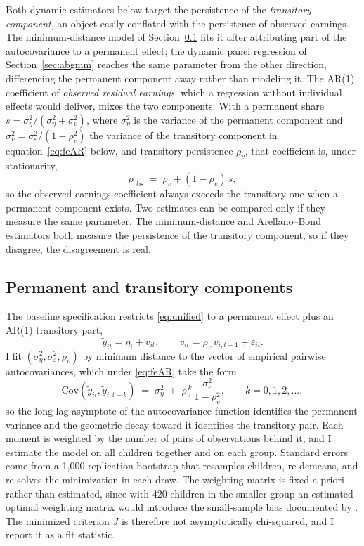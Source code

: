 \documentclass[11pt]{article}
\begin{document}
Both dynamic estimators below target the persistence of the
\emph{transitory component}, an object easily conflated with the
persistence of observed earnings. The minimum-distance model of
Section~\ref{sec:md} fits it after attributing part of the
autocovariance to a permanent effect; the dynamic panel regression of
Section~\ref{sec:abgmm} reaches the same parameter from the other
direction, differencing the permanent component away rather than
modeling it. The AR(1) coefficient of \emph{observed residual
earnings}, which a regression without individual effects would deliver,
mixes the two components. With a permanent share
$s = \sigma^2_\eta / (\sigma^2_\eta + \sigma^2_v)$, where
$\sigma^2_\eta$ is the variance of the permanent component and
$\sigma^2_v = \sigma^2_\varepsilon/(1-\rho_v^2)$ the variance of the
transitory component in equation~\eqref{eq:feAR} below, and transitory
persistence $\rho_v$,
that coefficient is, under stationarity,
\begin{equation}
\rho_{\mathrm{obs}} \;=\; \rho_v + (1 - \rho_v)\, s,
\label{eq:rhoobs}
\end{equation}
so the observed-earnings coefficient always exceeds the transitory one
when a permanent component exists. Two estimates can be compared
only if they measure the same parameter. The minimum-distance and
Arellano--Bond estimators both measure the persistence of the
transitory component, so if they disagree, the disagreement is real.

\subsection{Permanent and transitory components}
\label{sec:md}

The baseline specification restricts \eqref{eq:unified} to a permanent
effect plus an AR(1) transitory part,
\begin{equation}
\tilde y_{it} = \eta_i + v_{it}, \qquad
v_{it} = \rho_v\, v_{i,t-1} + \varepsilon_{it}.
\label{eq:feAR}
\end{equation}
I fit $(\sigma^2_\eta, \sigma^2_\varepsilon, \rho_v)$ by minimum
distance to the vector of empirical pairwise autocovariances, which
under \eqref{eq:feAR} take the form
\begin{equation}
\mathrm{Cov}\left(\tilde y_{it}, \tilde y_{i,t+k}\right)
\;=\; \sigma^2_\eta \;+\; \rho_v^{\,k}\,
\frac{\sigma^2_\varepsilon}{1-\rho_v^2},
\qquad k = 0, 1, 2, \dots,
\label{eq:moments}
\end{equation}
so the long-lag asymptote of the autocovariance function identifies
the permanent variance and the geometric decay toward it identifies
the transitory pair. Each moment is weighted by the number of pairs of
observations behind it, and I estimate the model on all children together and on each group.
Standard errors come from a 1,000-replication bootstrap that resamples
children, re-demeans, and re-solves the minimization in each draw. The weighting matrix is fixed a priori rather than estimated, since with 420 children in the smaller group an estimated optimal weighting matrix would introduce the small-sample bias documented by \citet{AltonjiSegal1996}. The minimized criterion $J$ is therefore not asymptotically chi-squared, and I report it as a fit statistic.
\end{document}
